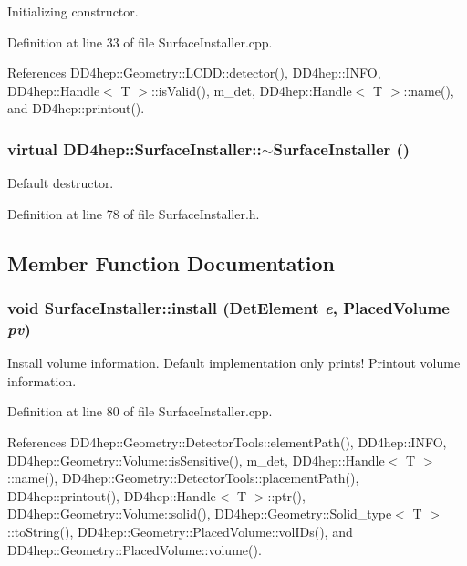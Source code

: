 Initializing constructor. 

Definition at line 33 of file SurfaceInstaller.cpp.

References DD4hep::Geometry::LCDD::detector(), DD4hep::INFO, DD4hep::Handle$<$ T $>$::isValid(), m\_\-det, DD4hep::Handle$<$ T $>$::name(), and DD4hep::printout().\hypertarget{class_d_d4hep_1_1_surface_installer_a4fa5c2ba032d20b735556b8e90aacfdb}{
\subsubsection[{$\sim$SurfaceInstaller}]{\setlength{\rightskip}{0pt plus 5cm}virtual DD4hep::SurfaceInstaller::$\sim$SurfaceInstaller ()}}
\label{class_d_d4hep_1_1_surface_installer_a4fa5c2ba032d20b735556b8e90aacfdb}


Default destructor. 

Definition at line 78 of file SurfaceInstaller.h.

\subsection{Member Function Documentation}
\hypertarget{class_d_d4hep_1_1_surface_installer_a88f2c3a607b0ef1f36ac4f00a28bd21b}{
\subsubsection[{install}]{\setlength{\rightskip}{0pt plus 5cm}void SurfaceInstaller::install ({\bf DetElement} {\em e}, \/  {\bf PlacedVolume} {\em pv})}}
\label{class_d_d4hep_1_1_surface_installer_a88f2c3a607b0ef1f36ac4f00a28bd21b}


Install volume information. Default implementation only prints! Printout volume information. 

Definition at line 80 of file SurfaceInstaller.cpp.

References DD4hep::Geometry::DetectorTools::elementPath(), DD4hep::INFO, DD4hep::Geometry::Volume::isSensitive(), m\_\-det, DD4hep::Handle$<$ T $>$::name(), DD4hep::Geometry::DetectorTools::placementPath(), DD4hep::printout(), DD4hep::Handle$<$ T $>$::ptr(), DD4hep::Geometry::Volume::solid(), DD4hep::Geometry::Solid\_\-type$<$ T $>$::toString(), DD4hep::Geometry::PlacedVolume::volIDs(), and DD4hep::Geometry::PlacedVolume::volume().

